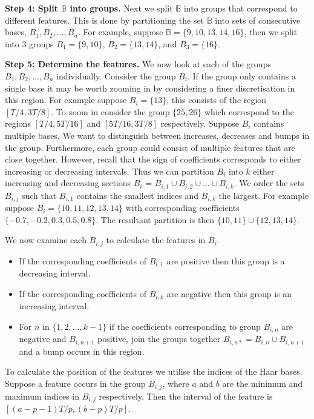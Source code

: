 \documentclass[12pt]{book} %
\begin{document}
 {\bf Step 4: Split $\mathbb{B}$ into groups.} Next we split $\mathbb{B}$ into groups that correspond to different features. This is done by partitioning the set $\mathbb{B}$ into sets of consecutive bases, $B_1, B_2, \dots, B_n$. For example, suppose $\mathbb{B} = \{9,10,13,14,16\}$, then we split into 3 groups $B_1 = \{9,10\}$, $B_2 = \{13,14\}$, and $B_3 = \{16\}$.    
 
{\bf Step 5: Determine the features.} We now look at each of the groups $B_1, B_2, \dots, B_n$ individually. Consider the group $B_i$. If the group only contains a single base it may be worth zooming in by considering a finer discretisation in this region. For example suppose $B_i = \{ 13\}$, this consists of the region $[T/4,3T/8]$. To zoom in consider the group $\{25,26\}$ which correspond to the regions $[T/4,5T/16]$ and $[5T/16,3T/8]$ respectively. 
Suppose $B_i$ contains multiple bases. We want to distinguish between increases, decreases and bumps in the group.  Furthermore, each group could consist of multiple features that are close together. However, recall that the sign of coefficients corresponds to either increasing or decreasing intervals. Thus we can partition $B_i$ into $k$ either increasing and decreasing sections $B_i$ = $B_{i,1} \cup B_{i,2} \cup \dots \cup B_{i,k}$. We order the sets $B_{i,j}$ such that $B_{i,1}$ contains the smallest indices and $B_{i,k}$ the largest. For example suppose $B_i = \{10,11,12,13,14\}$ with corresponding coefficients $\{-0.7,-0.2,0.3,0.5,0.8\}$. The resultant partition is then $\{10,11\} \cup \{12,13,14\}$. 

We now examine each $B_{i,j}$ to calculate the features in $B_i$.
\begin{itemize}
	\item If the corresponding coefficients of $B_{i,1}$ are positive then this group is a decreasing interval.
	\item If the corresponding coefficients of $B_{i,k}$ are negative then this group is an increasing interval.
	\item For $n$ in $\{1,2,\dots,k-1\}$ if the coefficients corresponding to group $B_{i,n}$ are negative and $B_{i,n+1}$ positive, join the groups together $B_{i,n*} = B_{i,n} \cup B_{i,n+1}$ and a bump occurs in this region. 
\end{itemize}
 To calculate the position of the features we utilise the indices of the Haar bases. Suppose a feature occurs in the group $B_{i,j}$, where $a$ and $b$ are the minimum and maximum indices in $B_{i,j}$ respectively. Then the interval of the feature is $\left[(a-p-1)T/p , (b-p)T/p \right]$.
 
\end{document}
